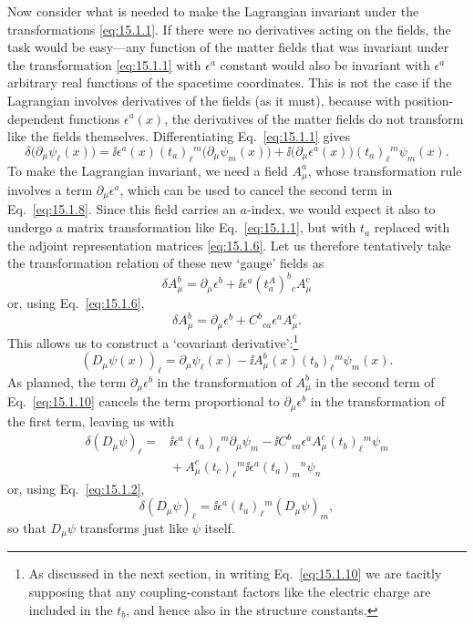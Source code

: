 Now consider what is needed to make the Lagrangian invariant under the
transformations \eqref{eq:15.1.1}. If there were no derivatives acting on the
fields, the task would be easy---any function of the matter fields that was
invariant under the transformation \eqref{eq:15.1.1} with $\epsilon^a$
constant would also be invariant with $\epsilon^a$ arbitrary real functions
of the spacetime coordinates. This is not the case if the Lagrangian involves
derivatives of the fields (as it must), because with position-dependent functions
$\epsilon^a(x)$, the derivatives of the matter fields do not transform like
the fields themselves. Differentiating Eq.~\eqref{eq:15.1.1} gives
\begin{equation}
 \delta\bigl(\partial_\mu\psi_\ell(x)\bigr)
 =\ii\epsilon^a(x)(t_a)_\ell{}^m\bigl(\partial_\mu\psi_m(x)\bigr)
 +\ii\bigl(\partial_\mu\epsilon^a(x)\bigr)(t_a)_\ell{}^m\psi_m(x) .
 \tag{15.1.8}\label{eq:15.1.8}
\end{equation}
To make the Lagrangian invariant, we need a field $A^a_\mu$, whose
transformation rule involves a term $\partial_\mu\epsilon^a$, which can be
used to cancel the second term in Eq.~\eqref{eq:15.1.8}. Since this field carries
an $a$-index, we would expect it also to undergo a matrix transformation
like Eq.~\eqref{eq:15.1.1}, but with $t_a$ replaced with the adjoint
representation matrices \eqref{eq:15.1.6}. Let us therefore tentatively take the
transformation relation of these new `gauge' fields as
\[
 \delta A^b_\mu=\partial_\mu\epsilon^b
 +\ii\epsilon^a(t^A_a)^b{}_c A^c_\mu
\]
or, using Eq.~\eqref{eq:15.1.6},
\begin{equation}
 \delta A^b_\mu=\partial_\mu\epsilon^b
 +C^b{}_{ca}\epsilon^a A^c_\mu .
 \tag{15.1.9}\label{eq:15.1.9}
\end{equation}
This allows us to construct a `covariant derivative':\footnote{As discussed in
the next section, in writing Eq.~\eqref{eq:15.1.10} we are tacitly supposing that
any coupling-constant factors like the electric charge are included in the
$t_b$, and hence also in the structure constants.}
\begin{equation}
 (D_\mu\psi(x))_\ell=\partial_\mu\psi_\ell(x)
 -\ii A^b_\mu(x)(t_b)_\ell{}^m\psi_m(x) .
 \tag{15.1.10}\label{eq:15.1.10}
\end{equation}
As planned, the term $\partial_\mu\epsilon^b$ in the transformation of
$A^b_\mu$ in the second term of Eq.~\eqref{eq:15.1.10} cancels the term
proportional to $\partial_\mu\epsilon^b$ in the transformation of the first
term, leaving us with
\begin{align*}
 \delta(D_\mu\psi)_\ell={}&\ii\epsilon^a(t_a)_\ell{}^m
 \partial_\mu\psi_m-\ii C^b{}_{ca}\epsilon^a
 A^c_\mu(t_b)_\ell{}^m\psi_m\\
 &{}+A^c_\mu(t_c)_\ell{}^m
 \ii\epsilon^a(t_a)_m{}^n\psi_n
\end{align*}
or, using Eq.~\eqref{eq:15.1.2},
\begin{equation}
 \delta(D_\mu\psi)_\ell=\ii\epsilon^a(t_a)_\ell{}^m(D_\mu\psi)_m ,
 \tag{15.1.11}\label{eq:15.1.11}
\end{equation}
so that $D_\mu\psi$ transforms just like $\psi$ itself.


